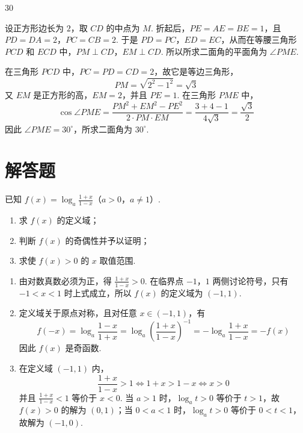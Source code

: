 \documentclass[UTF8,a4paper,oneside,11pt]{ctexbook}
\begin{document}
\begin{answer}
30
\end{answer}

\begin{solution}
设正方形边长为 \(2\)，取 \(CD\) 的中点为 \(M\). 折起后，\(PE=AE=BE=1\)，且
\(PD=DA=2\)，\(PC=CB=2\).
于是 \(PD=PC\)，\(ED=EC\)，从而在等腰三角形 \(PCD\) 和 \(ECD\) 中，\(PM\perp CD\)，\(EM\perp CD\). 所以所求二面角的平面角为 \(\angle PME\).

在三角形 \(PCD\) 中，\(PC=PD=CD=2\)，故它是等边三角形，
\[
PM=\sqrt{2^2-1^2}=\sqrt3
\]
又 \(EM\) 是正方形的高，\(EM=2\)，并且 \(PE=1\). 在三角形 \(PME\) 中，
\[
\cos\angle PME
=\frac{PM^2+EM^2-PE^2}{2\cdot PM\cdot EM}
=\frac{3+4-1}{4\sqrt3}
=\frac{\sqrt3}{2}
\]
因此 \(\angle PME=30^\circ\)，所求二面角为 \(30^\circ\).
\end{solution}

\section{解答题}

\begin{problem}
已知 \(f(x)=\log_a\frac{1+x}{1-x}\)（\(a>0\)，\(a\neq 1\)）.

\begin{enumerate}
\item 求 \(f(x)\) 的定义域；
\item 判断 \(f(x)\) 的奇偶性并予以证明；
\item 求使 \(f(x)>0\) 的 \(x\) 取值范围.
\end{enumerate}
\end{problem}

\begin{solution}
\begin{enumerate}
\item 由对数真数必须为正，得 \(\frac{1+x}{1-x}>0\).
在临界点 \(-1\)，\(1\) 两侧讨论符号，只有 \(-1<x<1\) 时上式成立，所以 \(f(x)\) 的定义域为 \((-1,1)\).

\item 定义域关于原点对称，且对任意 \(x\in(-1,1)\)，有
\[
f(-x)=\log_a\frac{1-x}{1+x}=\log_a\left(\frac{1+x}{1-x}\right)^{-1}=-\log_a\frac{1+x}{1-x}=-f(x)
\]
因此 \(f(x)\) 是奇函数.

\item 在定义域 \((-1,1)\) 内，
\[
\frac{1+x}{1-x}>1\Longleftrightarrow 1+x>1-x\Longleftrightarrow x>0
\]
并且 \(\frac{1+x}{1-x}<1\) 等价于 \(x<0\). 当 \(a>1\) 时，\(\log_a t>0\) 等价于 \(t>1\)，故 \(f(x)>0\) 的解为 \((0,1)\)；当 \(0<a<1\) 时，\(\log_a t>0\) 等价于 \(0<t<1\)，故解为 \((-1,0)\).
\end{enumerate}
\end{solution}
\end{document}
